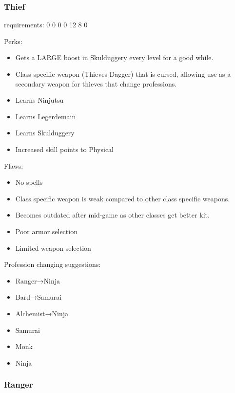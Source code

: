 \documentclass[12pt]{article}
\newcommand{\WviiTwoColumnSetup}{\raggedcolumns\RaggedRight}
\begin{document}
\subsubsection{Thief}\label{thief}

requirements: 0 0 0 0 12 8 0

\begin{multicols}{2}\WviiTwoColumnSetup
Perks:

\begin{itemize}
\item
  Gets a LARGE boost in Skulduggery every level for a good while.
\item
  Class specific weapon (Thieves Dagger) that is cursed, allowing use as
  a secondary weapon for thieves that change professions.
\item
  Learns Ninjutsu
\item
  Learns Legerdemain
\item
  Learns Skulduggery
\item
  Increased skill points to Physical
\end{itemize}
\columnbreak

Flaws:

\begin{itemize}
\item
  No spells
\item
  Class specific weapon is weak compared to other class specific weapons.
\item
  Becomes outdated after mid-game as other classes get better kit.
\item
  Poor armor selection
\item
  Limited weapon selection
\end{itemize}
\end{multicols}

Profession changing suggestions:

\begin{itemize}
\item
  Ranger→Ninja
\item
  Bard→Samurai
\item
  Alchemist→Ninja
\item
  Samurai
\item
  Monk
\item
  Ninja
\end{itemize}

\subsubsection{Ranger}\label{ranger}
\end{document}
